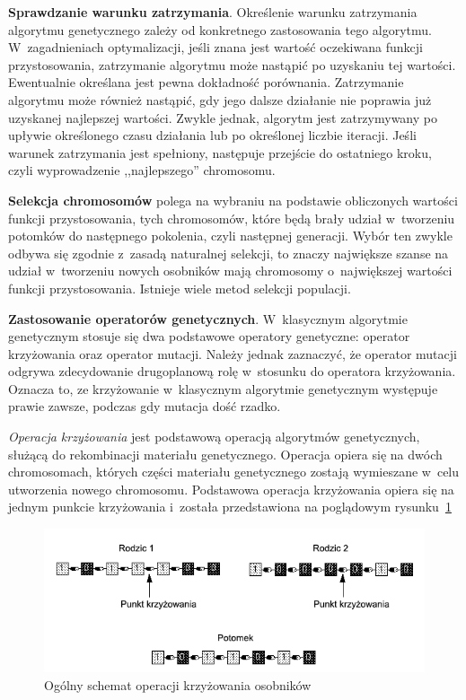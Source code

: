 \documentclass[twoside,12pt]{report}
\begin{document}
\textbf{Sprawdzanie warunku zatrzymania}. Określenie warunku zatrzymania algorytmu genetycznego zależy od konkretnego zastosowania tego algorytmu. W~zagadnieniach optymalizacji, jeśli znana jest wartość oczekiwana funkcji przystosowania, zatrzymanie algorytmu może nastąpić po uzyskaniu tej wartości. Ewentualnie określana jest pewna dokładność porównania. Zatrzymanie algorytmu może również nastąpić, gdy jego dalsze działanie nie poprawia już uzyskanej najlepszej wartości. Zwykle jednak, algorytm jest zatrzymywany po upływie określonego czasu działania lub po określonej liczbie iteracji. Jeśli warunek zatrzymania jest spełniony, następuje przejście do ostatniego kroku, czyli wyprowadzenie ,,najlepszego'' chromosomu.

\textbf{Selekcja chromosomów} polega na wybraniu na podstawie obliczonych wartości funkcji przystosowania, tych chromosomów, które będą brały udział w~tworzeniu potomków do następnego pokolenia, czyli następnej generacji. Wybór ten zwykle odbywa się zgodnie z~zasadą naturalnej selekcji, to znaczy największe szanse na udział w~tworzeniu nowych osobników mają chromosomy o~największej wartości funkcji przystosowania. Istnieje wiele metod selekcji populacji.

\textbf{Zastosowanie operatorów genetycznych}. W~klasycznym algorytmie genetycznym stosuje się dwa podstawowe operatory genetyczne: operator
krzyżowania oraz operator mutacji. Należy jednak zaznaczyć, że operator
mutacji odgrywa zdecydowanie drugoplanową rolę w~stosunku do operatora krzyżowania. Oznacza to, ze krzyżowanie w~klasycznym algorytmie genetycznym występuje prawie zawsze, podczas gdy mutacja dość rzadko. 

\textit{Operacja krzyżowania} jest podstawową operacją algorytmów genetycznych, służącą do rekombinacji materiału genetycznego. Operacja opiera się na dwóch chromosomach, których części materiału genetycznego zostają wymieszane w~celu utworzenia nowego chromosomu. Podstawowa operacja krzyżowania opiera się na jednym punkcie krzyżowania i~została przedstawiona na poglądowym rysunku~\ref{fig:krzyzowanie_schemat}~\cite{genetyczne-dane=ewo}

\begin{figure}[htbp]
	\centering
	\includegraphics[width=\textwidth]{img/crossover}
	\caption{Ogólny schemat operacji krzyżowania osobników}
	\label{fig:krzyzowanie_schemat}
\end{figure}
\end{document}
